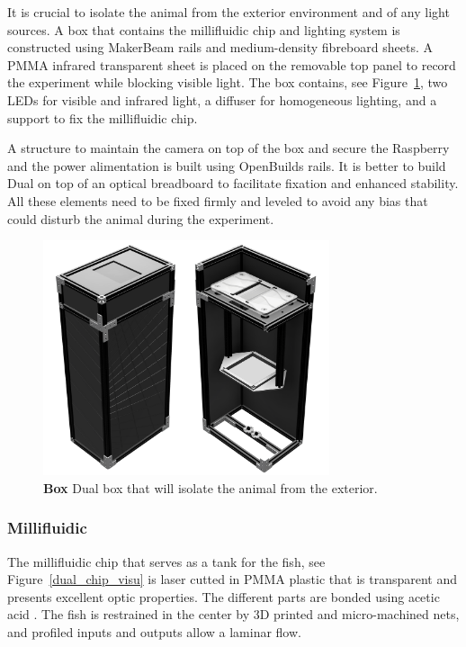   It is crucial to isolate the animal from the exterior environment and of any light sources. A box that contains the millifluidic chip and lighting system is constructed using MakerBeam rails and medium-density fibreboard sheets. A PMMA infrared transparent sheet is placed on the removable top panel to record the experiment while blocking visible light. The box contains, see Figure~\ref{dual_box}, two LEDs for visible and infrared light, a diffuser for homogeneous lighting, and a support to fix the millifluidic chip.

  A structure to maintain the camera on top of the box and secure the Raspberry and the power alimentation is built using OpenBuilds rails. It is better to build Dual on top of an optical breadboard to facilitate fixation and enhanced stability. All these elements need to be fixed firmly and leveled to avoid any bias that could disturb the animal during the experiment.

    \begin{figure}[h!]
      \centering
      \includegraphics[width=0.75\textwidth]{part_2/assets/box.png}
      \caption{\textbf{Box} Dual box that will isolate the animal from the exterior.}
      \label{dual_box}
    \end{figure}

  \subsubsection{Millifluidic}
  The millifluidic chip that serves as a tank for the fish, see Figure~\ref{dual_chip_visu} is laser cutted in PMMA plastic that is transparent and presents excellent optic properties. The different parts are bonded using acetic acid \cite{trinh2019clog}. The fish is restrained in the center by 3D printed and micro-machined nets, and profiled inputs and outputs allow a laminar flow.

